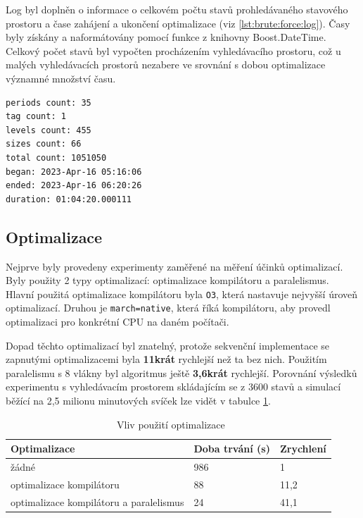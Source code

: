 Log byl doplněn o informace o celkovém počtu stavů prohledávaného stavového prostoru a čase zahájení a ukončení optimalizace (viz \ref{lst:brute:force:log}).
Časy byly získány a naformátovány pomocí funkce z knihovny Boost.DateTime.
Celkový počet stavů byl vypočten procházením vyhledávacího prostoru, což u malých vyhledávacích prostorů nezabere ve srovnání s dobou optimalizace významné množství času.

\begin{lstlisting}[caption={~Rozšíření logu pro algoritmus hrubé síly},label={lst:brute:force:log},captionpos=t,abovecaptionskip=-\medskipamount,belowcaptionskip=\medskipamount]
periods count: 35
tag count: 1
levels count: 455
sizes count: 66
total count: 1051050
began: 2023-Apr-16 05:16:06
ended: 2023-Apr-16 06:20:26
duration: 01:04:20.000111
\end{lstlisting}

\subsection{Optimalizace}
Nejprve byly provedeny experimenty zaměřené na měření účinků optimalizací.
Byly použity 2 typy optimalizací: optimalizace kompilátoru a paralelismus.
Hlavní použitá optimalizace kompilátoru byla \texttt{O3}, která nastavuje nejvyšší úroveň optimalizací.
Druhou je \texttt{march=native}, která říká kompilátoru, aby provedl optimalizaci pro konkrétní CPU na daném počítači.

Dopad těchto optimalizací byl znatelný, protože sekvenční implementace se zapnutými optimalizacemi byla \textbf{11krát} rychlejší než ta bez nich.
Použitím paralelismu s 8 vlákny byl algoritmus ještě \textbf{3,6krát} rychlejší.
Porovnání výsledků experimentu s vyhledávacím prostorem skládajícím se z 3600 stavů a simulací běžící na 2,5 milionu minutových svíček lze vidět v tabulce \ref{tab:brute:force:optimization}.

\begin{table}[!htbp]
\centering
\caption[Vliv použití optimalizace]{~Vliv použití optimalizace}\label{tab:brute:force:optimization}
\begin{tabular}{|l|l|l|}
\hline
\textbf{Optimalizace}                  & \textbf{Doba trvání (s)} & \textbf{Zrychlení} \\ \hline
žádné                                   & 986                      & 1                                                     \\ \hline
optimalizace kompilátoru                & 88                       & 11,2                                                  \\ \hline
optimalizace kompilátoru a paralelismus & 24                       & 41,1                                                   \\ \hline
\end{tabular}
\end{table}

